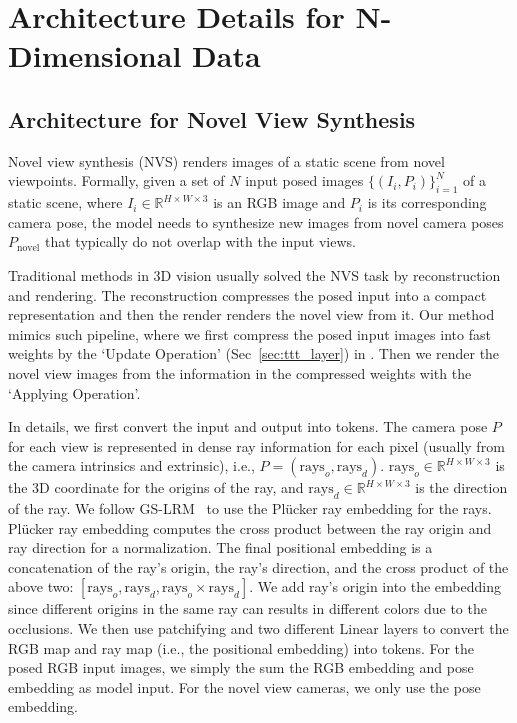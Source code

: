 \documentclass{article}
\newcommand{\img}{I}
\begin{document}
\section{\methodname{} Architecture Details for N-Dimensional Data }
\label{sec:appen_model_arch}

\subsection{\methodname{} Architecture for Novel View Synthesis}
\label{sec:appen_nvs_model_arch}

Novel view synthesis (NVS) renders images of a static scene from novel viewpoints. 
Formally, given a set of $N$ input posed images $\{ (  \img_i, P_i ) \}_{i=1}^N$ of a static scene, 
where $I_i \in \mathbb{R}^{H\times W \times 3}$ is an RGB image and $P_i$ is its corresponding camera pose,
the model needs to synthesize new images from novel camera poses $P_\text{novel}$ that typically do not overlap with the input views. 

Traditional methods in 3D vision usually solved the NVS task by reconstruction and rendering. 
The reconstruction compresses the posed input into a compact representation and then the render renders the novel view from it.
Our method mimics such pipeline, where we first compress the posed input images into fast weights by the `Update Operation' (Sec~\ref{sec:ttt_layer}) in \methodname{}.
Then we render the novel view images from the information in the compressed weights with the `Applying Operation'.

In details, we first convert the input and output into tokens.
The camera pose $P$ for each view is represented in dense ray information for each pixel (usually from the camera intrinsics and extrinsic), i.e., $P = (\text{rays}_o, \text{rays}_d)$.
$\text{rays}_o \in \mathbb{R}^{H\times W \times 3}$ is the 3D coordinate for the origins of the ray, and $\text{rays}_d \in \mathbb{R}^{H\times W \times 3}$ is the direction of the ray.
We follow GS-LRM~\cite{zhang2024gs} to use the Pl\"ucker ray embedding for the rays.
Pl\"ucker ray embedding computes the cross product between the ray origin and ray direction for a normalization.
The final positional embedding is a concatenation of the ray's origin, the ray's direction, and the cross product of the above two:
$[\text{rays}_o, \text{rays}_d, \text{rays}_o \times \text{rays}_d]$.
We add ray's origin into the embedding since different origins in the same ray can results in different colors due to the occlusions.
We then use patchifying and two different Linear layers to convert the RGB map and ray map (i.e., the positional embedding) into tokens.
For the posed RGB input images, we simply the sum the RGB embedding and pose embedding as model input.
For the novel view cameras, we only use the pose embedding.
\end{document}

